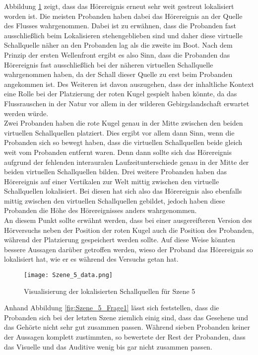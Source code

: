 Abbildung \ref{fig:Szene_5_data} zeigt, dass das Hörereignis erneut sehr weit gestreut lokalisiert worden ist. Die meisten Probanden haben dabei das Hörereignis an der Quelle des Flusses wahrgenommen. Dabei ist zu erwähnen, dass die Probanden fast ausschließlich beim Lokalisieren stehengeblieben sind und daher diese virtuelle Schallquelle näher an den Probanden lag als die zweite im Boot. Nach dem Prinzip der ersten Wellenfront ergibt es also Sinn, dass die Probanden das Hörereignis fast ausschließlich bei der näheren virtuellen Schallquelle wahrgenommen haben, da der Schall dieser Quelle zu erst beim Probanden angekommen ist. Des Weiteren ist davon auszugehen, dass der inhaltliche Kontext eine Rolle bei der Platzierung der roten Kugel gespielt haben könnte, da das Flussrauschen in der Natur vor allem in der wilderen Gebirgslandschaft erwartet werden würde.\\

Zwei Probanden haben die rote Kugel genau in der Mitte zwischen den beiden virtuellen Schallquellen platziert. Dies ergibt vor allem dann Sinn, wenn die Probanden sich so bewegt haben, dass die virtuellen Schallquellen beide gleich weit vom Probanden entfernt waren. Denn dann sollte sich das Hörereignis aufgrund der fehlenden interauralen Laufzeitunterschiede genau in der Mitte der beiden virtuellen Schallquellen bilden. Drei weitere Probanden haben das Hörereignis auf einer Vertikalen zur Welt mittig zwischen den virtuelle Schallquellen lokalisiert. Bei diesen hat sich also das Hörereignis also ebenfalls mittig zwischen den virtuellen Schallquellen gebildet, jedoch haben diese Probanden die Höhe des Hörereignisses anders wahrgenommen.\\ 

An diesem Punkt sollte erwähnt werden, dass bei einer ausgereifteren Version des Hörversuchs neben der Position der roten Kugel auch die Position des Probanden, während der Platzierung gespeichert werden sollte. Auf diese Weise könnten bessere Aussagen darüber getroffen werden, wieso der Proband das Hörereignis so lokalisiert hat, wie er es während des Versuchs getan hat. 



   \begin{figure}[H]
\centering
\texttt{[image: Szene\_5\_data.png]}
\caption{Visualisierung der lokalisierten Schallquellen für Szene 5}
\label{fig:Szene_5_data}
\end{figure} 

Anhand Abbildung \ref{fig:Szene_5_Frage1} lässt sich feststellen, dass die Probanden sich bei der letzten Szene ziemlich einig sind, dass das Gesehene und das Gehörte nicht sehr gut zusammen passen. Während sieben Probanden keiner der Aussagen komplett zustimmten, so bewertete der Rest der Probanden, dass das Visuelle und das Auditive wenig bis gar nicht zusammen passen. \\


